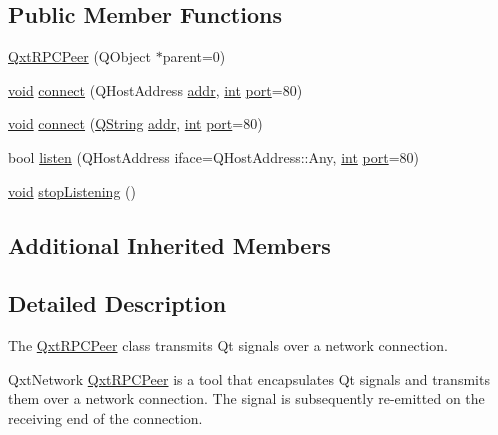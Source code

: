 \subsection*{Public Member Functions}
\begin{DoxyCompactItemize}
\item 
\hyperlink{class_qxt_r_p_c_peer_a2ca9ef835583cbbb61dae031effea560}{Qxt\-R\-P\-C\-Peer} (Q\-Object $\ast$parent=0)
\item 
\hyperlink{group___u_a_v_objects_plugin_ga444cf2ff3f0ecbe028adce838d373f5c}{void} \hyperlink{class_qxt_r_p_c_peer_ae0c492f74829b363831bb4ce75a1d21f}{connect} (Q\-Host\-Address \hyperlink{glext_8h_a992d3255fe3323885b064097997f4c95}{addr}, \hyperlink{ioapi_8h_a787fa3cf048117ba7123753c1e74fcd6}{int} \hyperlink{classport}{port}=80)
\item 
\hyperlink{group___u_a_v_objects_plugin_ga444cf2ff3f0ecbe028adce838d373f5c}{void} \hyperlink{class_qxt_r_p_c_peer_a9964cffb5cb5aa0d01242e25f795b5d3}{connect} (\hyperlink{group___u_a_v_objects_plugin_gab9d252f49c333c94a72f97ce3105a32d}{Q\-String} \hyperlink{glext_8h_a992d3255fe3323885b064097997f4c95}{addr}, \hyperlink{ioapi_8h_a787fa3cf048117ba7123753c1e74fcd6}{int} \hyperlink{classport}{port}=80)
\item 
bool \hyperlink{class_qxt_r_p_c_peer_aae7fcd6b1720ea10f08859a8d896a110}{listen} (Q\-Host\-Address iface=Q\-Host\-Address\-::\-Any, \hyperlink{ioapi_8h_a787fa3cf048117ba7123753c1e74fcd6}{int} \hyperlink{classport}{port}=80)
\item 
\hyperlink{group___u_a_v_objects_plugin_ga444cf2ff3f0ecbe028adce838d373f5c}{void} \hyperlink{class_qxt_r_p_c_peer_a2656eda811259c6c75702d3952f49afd}{stop\-Listening} ()
\end{DoxyCompactItemize}
\subsection*{Additional Inherited Members}


\subsection{Detailed Description}
The \hyperlink{class_qxt_r_p_c_peer}{Qxt\-R\-P\-C\-Peer} class transmits Qt signals over a network connection. 

Qxt\-Network \hyperlink{class_qxt_r_p_c_peer}{Qxt\-R\-P\-C\-Peer} is a tool that encapsulates Qt signals and transmits them over a network connection. The signal is subsequently re-\/emitted on the receiving end of the connection.

